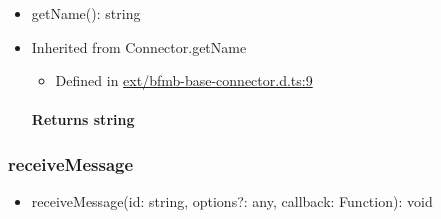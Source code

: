 \documentclass[]{article}
\providecommand{\tightlist}{%
  \setlength{\itemsep}{0pt}\setlength{\parskip}{0pt}}
\let\oldparagraph\paragraph
\renewcommand{\paragraph}[1]{\oldparagraph{#1}\mbox{}}
\begin{document}
\begin{itemize}
\tightlist
\item
  getName{(}{)}{: }{string}
\end{itemize}

\begin{itemize}
\item
  Inherited from Connector.getName

  \begin{itemize}
  \tightlist
  \item
    Defined in
    \href{https://github.com/BFMBFramework/TadoConnector/blob/f05932b/src/ext/bfmb-base-connector.d.ts\#L9}{ext/bfmb-base-connector.d.ts:9}
  \end{itemize}

  \hypertarget{returns-string}{%
  \paragraph{\texorpdfstring{Returns
  {string}}{Returns string}}\label{returns-string}}
\end{itemize}

\protect\hypertarget{receivemessage}{}{}

\hypertarget{receivemessage}{%
\subsubsection{receiveMessage}\label{receivemessage}}

\begin{itemize}
\tightlist
\item
  receiveMessage{(}id{: }{string}, options{?: }{any}, callback{:
  }{Function}{)}{: }{void}
\end{itemize}
\end{document}

